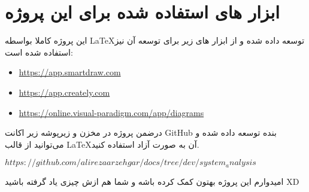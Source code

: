 \newpage

\section{ابزار های استفاده شده برای این پروژه}

این پروژه کاملا بواسطه \LaTeX توسعه داده شده و از ابزار های زیر برای توسعه آن نیز استفاده شده است:

\begin{itemize}
	\item \hyperref[https://app.smartdraw.com]{https://app.smartdraw.com}
	\item \hyperref[https://app.creately.com]{https://app.creately.com}
	\item \hyperref[https://online.visual-paradigm.com/app/diagrams]{https://online.visual-paradigm.com/app/diagrams}
\end{itemize}

درضمن پروژه در مخزن و زیرپوشه زیر اکانت GitHub بنده توسعه داده شده و می‌توانید از قالب \LaTeX آن به صورت آزاد استفاده کنید.

$\hyperref[https://github.com/alirezaarzehgar/docs/tree/dev/system_analysis]{https://github.com/alirezaarzehgar/docs/tree/dev/system_analysis}$

امیدوارم این پروژه بهتون کمک کرده باشه و شما هم ازش چیزی یاد گرفته باشید XD
